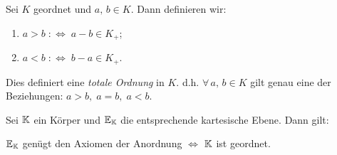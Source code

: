 \begin{defi}
Sei $K$ geordnet und $a,\,b\in K$. Dann definieren wir:
\begin{enumerate}
    \item[] $a>b\;:\Longleftrightarrow\;a-b\in K_+$;
    \item[] $a<b\;:\Longleftrightarrow\;b-a\in K_+$.
\end{enumerate}
\end{defi}

Dies definiert eine {\em totale Ordnung} in $K$. d.h.
$\forall\,a,\,b\in K$ gilt genau eine der Beziehungen:
$a>b,\;a=b,\;a<b$.




\begin{thm}
Sei $\mathbb K$ ein K\"{o}rper und $\mathbb E_{\mathbb K}$ die entsprechende
kartesische Ebene. Dann gilt:
\begin{center}
$\mathbb E_{\mathbb K}$ gen\"{u}gt den Axiomen der Anordnung
$\Longleftrightarrow$ $\mathbb K$ ist geordnet.
\end{center}
\end{thm}

